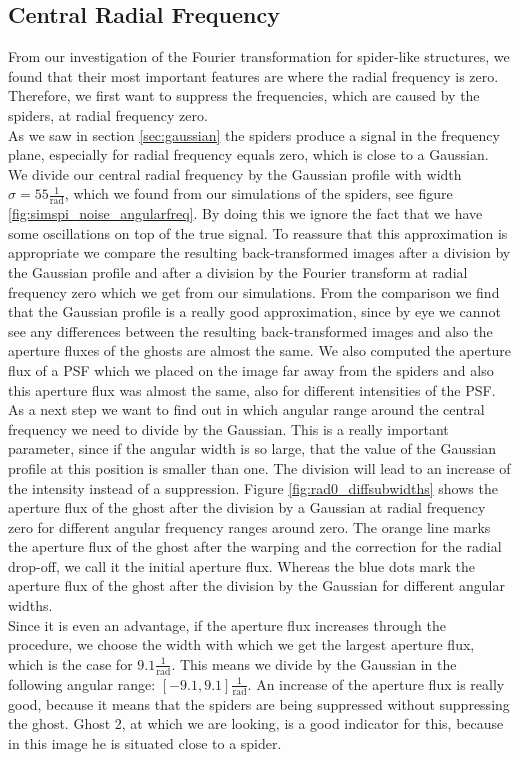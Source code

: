 \subsection{Central Radial Frequency}
\label{sec:central_radial_freq}
From our investigation of the Fourier transformation for spider-like structures, we found that their most important features are where the radial frequency is zero. Therefore, we first want to suppress the frequencies, which are caused by the spiders, at radial frequency zero.\\
As we saw in section \ref{sec:gaussian} the spiders produce a signal in the frequency plane, especially for radial frequency equals zero, which is close to a Gaussian. We divide our central radial frequency by the Gaussian profile with width $\sigma = 55 \frac{1}{\mathrm{rad}}$, which we found from our simulations of the spiders, see figure \ref{fig:simspi_noise_angularfreq}. By doing this we ignore the fact that we have some oscillations on top of the true signal. To reassure that this approximation is appropriate we compare the resulting back-transformed images after a division by the Gaussian profile and after a division by the Fourier transform at radial frequency zero which we get from our simulations. From the comparison we find that the Gaussian profile is a really good approximation, since by eye we cannot see any differences between the resulting back-transformed images and also the aperture fluxes of the ghosts are almost the same. We also computed the aperture flux of a PSF which we placed on the image far away from the spiders and also this aperture flux was almost the same, also for different intensities of the PSF.\\
As a next step we want to find out in which angular range around the central frequency we need to divide by the Gaussian. This is a really important parameter, since if the angular width is so large, that the value of the Gaussian profile at this position is smaller than one. The division will lead to an increase of the intensity instead of a suppression. Figure \ref{fig:rad0_diffsubwidths} shows the aperture flux of the ghost after the division by a Gaussian at radial frequency zero for different angular frequency ranges around zero. The orange line marks the aperture flux of the ghost after the warping and the correction for the radial drop-off, we call it the initial aperture flux. Whereas the blue dots mark the aperture flux of the ghost after the division by the Gaussian for different angular widths.\\
Since it is even an advantage, if the aperture flux increases through the procedure, we choose the width with which we get the largest aperture flux, which is the case for $9.1 \frac{1}{\mathrm{rad}}$. This means we divide by the Gaussian in the following angular range: $[-9.1, 9.1] \frac{1}{\mathrm{rad}}$. An increase of the aperture flux is really good, because it means that the spiders are being suppressed without suppressing the ghost. Ghost 2, at which we are looking, is a good indicator for this, because in this image he is situated close to a spider.
